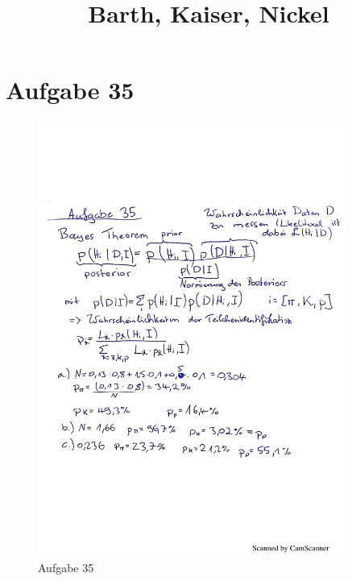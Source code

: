 

\subject{Blatt 10}
\title{Barth, Kaiser, Nickel}



\maketitle
\thispagestyle{empty}




\section{Aufgabe 35}
\begin{figure}[H]
  \centering
    \includegraphics[width=0.9\textwidth]{test.pdf}
      \caption{Aufgabe 35}
\end{figure}




